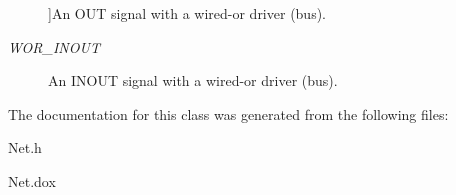 \begin{Desc}
\begin{description}
{}]An O\-U\-T signal with a wired-\/or driver (bus). \item[{\em 
\hypertarget{classHurricane_1_1Net_1_1Direction_a5b34d7c3ac52628861af3a46f781fae4a2fbc95d7882aab3453d5549493763c3c}{W\-O\-R\-\_\-\-I\-N\-O\-U\-T}\label{classHurricane_1_1Net_1_1Direction_a5b34d7c3ac52628861af3a46f781fae4a2fbc95d7882aab3453d5549493763c3c}
}]An I\-N\-O\-U\-T signal with a wired-\/or driver (bus). \end{description}
\end{Desc}


The documentation for this class was generated from the following files\-:\begin{DoxyCompactItemize}
\item 
Net.\-h\item 
Net.\-dox\end{DoxyCompactItemize}
